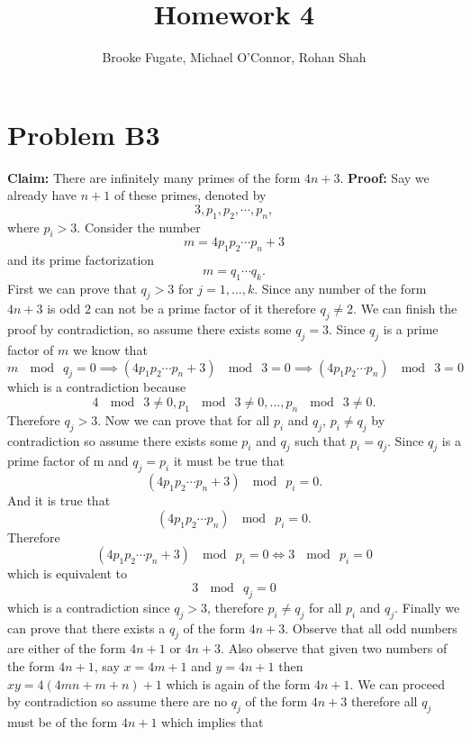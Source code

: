 \documentclass[12pt]{article}
\begin{document}
\pagestyle{plain}
\titleformat{\subsection}[runin]
  {\normalfont\large\bfseries}{\thesubsection}{1em}{}

\title{Homework 4}
\author{Brooke Fugate, Michael O'Connor, Rohan Shah}
\date{}

\maketitle

\section*{Problem B3}
\textbf{Claim:} There are infinitely many primes of the form $4n+3$.
\newline
\textbf{Proof:} Say we already have $n+1$ of these primes, denoted by
$$3, p_1, p_2, \cdots, p_n,$$
where $p_i > 3$. Consider the number
$$m = 4p_1p_2 \cdots p_n + 3$$
and its prime factorization
$$m=q_1 \cdots q_k.$$
First we can prove that $q_j > 3$ for $j = 1,...,k$. Since any number of the
form $4n+3$ is odd $2$ can not be a prime factor of it therefore $q_j \neq 2$.
We can finish the proof by
contradiction, so assume there exists some $q_j = 3$. Since $q_j$ is a prime
factor of $m$ we know that
$$m\ \mod\ q_j = 0 \implies (4p_1p_2 \cdots p_n + 3)\ \mod\ 3 = 0
\implies (4p_1p_2 \cdots p_n)\ \mod\ 3 = 0$$
which is a contradiction because
$$4\ \mod\ 3 \neq 0,p_1\ \mod\ 3 \neq 0,...,p_n\ \mod\ 3 \neq 0.$$
Therefore $q_j > 3$. Now we can prove that for all $p_i$ and $ q_j$,
$p_i \neq q_j$ by contradiction so assume there exists some $p_i$ and $q_j$ such
that $p_i = q_j$. Since $q_j$ is a prime factor of m and $q_j = p_i$ it must be
true that
$$(4p_1p_2 \cdots p_n + 3)\ \mod\ p_i = 0.$$
And it is true that
$$(4p_1p_2 \cdots p_n)\ \mod\ p_i = 0.$$
Therefore
$$(4p_1p_2 \cdots p_n + 3)\ \mod\ p_i = 0 \iff 3\ \mod\ p_i = 0$$
which is equivalent to
$$3\ \mod\ q_j = 0$$
which is a contradiction since $q_j > 3$, therefore $p_i \neq q_j$ for all $p_i$
and $q_j$. Finally we can prove that there exists a $q_j$ of the form $4n+3$.
Observe that all odd numbers are either of the form $4n+1$ or $4n+3$. Also
observe that given two numbers of the form $4n+1$, say $x = 4m+1$ and
$y = 4n+1$ then $xy = 4(4mn + m + n) + 1$ which is again of the form $4n+1$.
We can proceed by contradiction so assume there are no $q_j$ of the form
$4n+3$ therefore all $q_j$ must be of the form $4n+1$ which implies that
\end{document}
